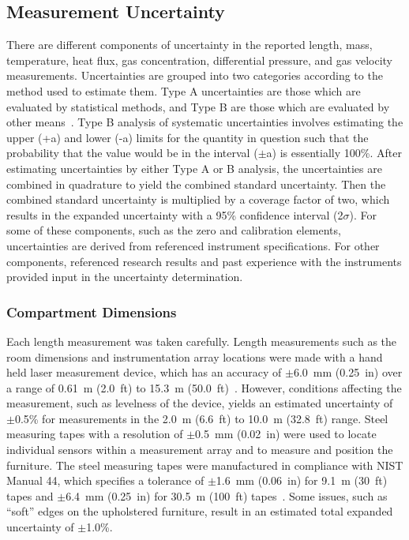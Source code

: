 \documentclass[12pt,oneside]{book}
\begin{document}
\subsection{Measurement Uncertainty}
\label{sec:Uncertainty}
There are different components of uncertainty in the reported length, mass, temperature, heat flux, gas concentration, differential pressure, and gas velocity measurements. Uncertainties are grouped into two categories according to the method used to estimate them. Type A uncertainties are those which are evaluated by statistical methods, and Type B are those which are evaluated by other means~\cite{Taylor&Kuyatt:1994}. Type B analysis of systematic uncertainties involves estimating the upper (+a) and lower (-a) limits for the quantity in question such that the probability that the value would be in the interval ($\pm$a) is essentially 100\%. After estimating uncertainties by either Type A or B analysis, the uncertainties are combined in quadrature to yield the combined standard uncertainty. Then the combined standard uncertainty is multiplied by a coverage factor of two, which results in the expanded uncertainty with a 95\% confidence interval (2$\sigma$). For some of these components, such as the zero and calibration elements, uncertainties are derived from referenced instrument specifications. For other components, referenced research results and past experience with the instruments provided input in the uncertainty determination.

\subsubsection{Compartment Dimensions}
Each length measurement was taken carefully. Length measurements such as the room dimensions and instrumentation array locations were made with a hand held laser measurement device, which has an accuracy of $\pm$6.0~mm (0.25~in) over a range of 0.61~m (2.0~ft) to 15.3~m (50.0~ft)~\cite{StanleyTools}. However, conditions affecting the measurement, such as levelness of the device, yields an estimated uncertainty of $\pm$0.5\% for measurements in the 2.0~m (6.6~ft) to 10.0~m (32.8~ft) range. Steel measuring tapes with a resolution of $\pm$0.5~mm (0.02~in) were used to locate individual sensors within a measurement array and to measure and position the furniture. The steel measuring tapes were manufactured in compliance with NIST Manual 44, which specifies a tolerance of $\pm$1.6~mm (0.06~in) for 9.1~m (30~ft) tapes and $\pm$6.4~mm (0.25~in) for 30.5~m (100~ft) tapes~\cite{Butcher:2012}. Some issues, such as ``soft'' edges on the upholstered furniture, result in an estimated total expanded uncertainty of $\pm$1.0\%.
\end{document}
